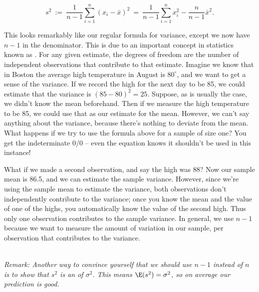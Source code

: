 \begin{equation*}

s^{2}\ := \ \frac{1}{n-1}\sum_{i=1}^{n}\left(x_{i}-\bar{x}\right)^{2}\ = \ \frac{1}{n-1}\sum_{i=1}^{n}x_{i}^{2}-\frac{n}{n-1}\bar{x}^{2}.

\end{equation*}



This looks remarkably like our regular formula for variance, except we now have $n-1$ in the denominator. This is due to an important concept in statistics known as . For any given estimate, the degrees of freedom are the number of independent observations that contribute to that estimate. Imagine we know that in Boston the average high temperature in August is $80^{\circ}$, and we want to get a sense of the variance. If we record the high for the next day to be 85, we could estimate that the variance is $\left(85-80\right)^{2}=25$. Suppose, as is usually the case, we didn't know the mean beforehand. Then if we measure the high temperature to be 85, we could use that as our estimate for the mean. However, we can't say anything about the variance, because there's nothing to deviate from the mean. What happens if we try to use the formula above for a sample of size one? You get the indeterminate 0/0 -- even the equation knows it shouldn't be used in this instance!



What if we made a second observation, and say the high was 88? Now our sample mean is 86.5, and we can estimate the sample variance. However, since we're using the sample mean to estimate the variance, both observations don't independently contribute to the variance; once you know the mean and the value of one of the highs, you automatically know the value of the second high. Thus only one observation contributes to the sample variance. In general, we use $n-1$ because we want to measure the amount of variation in our sample, per observation that contributes to the variance.



\ \\



\noindent \emph{Remark: Another way to convince yourself that we should use $n-1$ instead of $n$ is to show that $s^{2}$ is an  of $\sigma^{2}$. This means $\E(s^{2})=\sigma^{2}$, so on average our prediction is good. }







